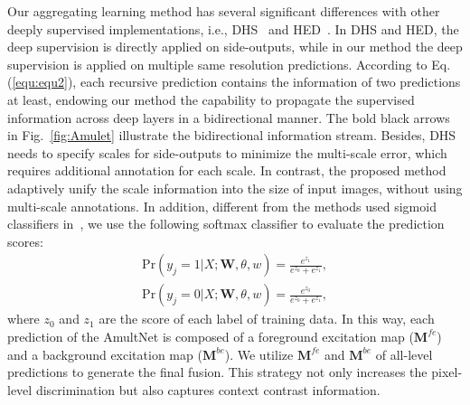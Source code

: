 \documentclass[10pt,twocolumn,letterpaper]{article}
\begin{document}
Our aggregating learning method has several significant differences with other deeply supervised implementations, i.e., DHS~\cite{liu2016dhsnet} and HED~\cite{xie2015holistically}.
In DHS and HED, the deep supervision is directly applied on side-outputs, while in our method the deep supervision is applied on multiple same resolution predictions.
According to Eq.(\ref{equ:equ2}), each recursive prediction contains the information of two predictions at least, endowing our method the capability to propagate the supervised information across deep layers in a bidirectional manner.
The bold black arrows in Fig.~\ref{fig:Amulet} illustrate the bidirectional information stream.
Besides, DHS needs to specify scales for side-outputs to minimize the multi-scale error, which requires additional annotation for each scale.
In contrast, the proposed method adaptively unify the scale information into the size of input images, without using multi-scale
annotations.
In addition, different from the methods used sigmoid classifiers in~\cite{liu2016dhsnet,xie2015holistically}, we use the following softmax classifier to evaluate the prediction scores:
\begin{align}
\text{Pr}(y_{j}=1|X;\textbf{W},\theta,w) = \frac{e^{z_1}}{e^{z_0}+e^{z_1}},
  \label{equ:equ8}
\end{align}
\begin{align}
\text{Pr}(y_{j}=0|X;\textbf{W},\theta,w) = \frac{e^{z_0}}{e^{z_0}+e^{z_1}},
  \label{equ:equ9}
\end{align}
where $z_0$ and $z_1$ are the score of each label of training data. In this way, each prediction of the AmultNet is composed of a foreground excitation map ($\textbf{M}^{fe}$) and a background excitation map ($\textbf{M}^{be}$).
We utilize $\textbf{M}^{fe}$ and $\textbf{M}^{be}$ of all-level predictions to generate the final fusion.
This strategy not only increases the pixel-level discrimination but also captures context contrast information.
\end{document}
